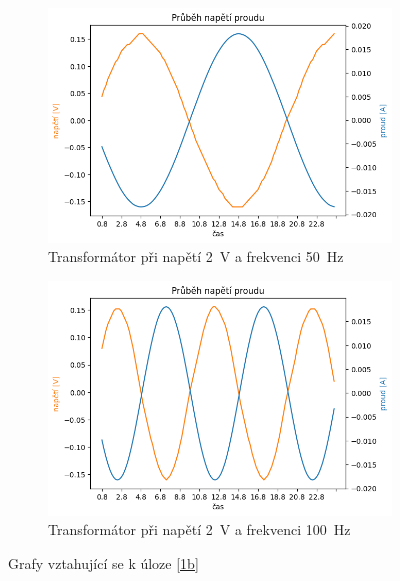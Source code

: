 \documentclass[a4paper]{article}
\begin{document}
\begin{figure}[h!]
\begin{subfigure}{0.49\textwidth}
		\includegraphics[width=\textwidth]{Trafo1b_2V_50Hz.png}
		\caption{Transformátor při napětí \SI{2}{\volt} a frekvenci \SI{50}{\hertz}}
	\end{subfigure}
	\hfill
	\begin{subfigure}{0.49\textwidth}
		\includegraphics[width=\textwidth]{Trafo1b_2V_100Hz.png}
		\caption{Transformátor při napětí \SI{2}{\volt} a frekvenci \SI{100}{\hertz}}
	\end{subfigure}
	\caption{Grafy vztahující se k úloze \ref{1b}}
\end{figure}
\end{document}
